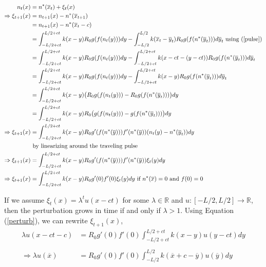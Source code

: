 \documentclass[12pt,english]{article}
\begin{document}
\begin{align}
n_t(x)&=n^*(\overline{x}_t)+\xi_t(x) \notag
\\ \Rightarrow \xi_{t+1}(x)&=n_{t+1}(x)-n^*(\overline{x}_{t+1}) \notag
\\&=n_{t+1}(x)-n^*(\overline{x}_{t}-c) \notag
\\ &=\int_{-L/2+ct}^{L/2+ct}k(x-y)R_0g(f(n_t(y)))dy-\int_{-L/2}^{L/2}k(\overline{x}_{t}-\overline{y}_t)R_0g(f(n^*(\overline{y}_t)))d\overline y_t \text{ using (\ref{pulse})} \notag
\\ &=\int_{-L/2+ct}^{L/2+ct}k(x-y)R_0g(f(n_t(y)))dy-\int_{-L/2+ct}^{L/2+ct}k(x-ct-(y-ct))R_0g(f(n^*(\overline{y}_t)))d\overline y_t \notag
\\ &=\int_{-L/2+ct}^{L/2+ct}k(x-y)R_0g(f(n_t(y)))dy-\int_{-L/2+ct}^{L/2+ct}k(x-y)R_0g(f(n^*(\overline{y}_t)))d\overline y_t \notag
\\ &=\int_{-L/2+ct}^{L/2+ct}k(x-y)\big(R_0g(f(n_t(y)))-R_0g(f(n^*(\overline{y}_t)))\big)dy \notag
\\ &=\int_{-L/2+ct}^{L/2+ct}k(x-y)R_0\big(g(f(n_t(y)))-g(f(n^*(\overline{y}_t)))\big)dy \notag
\\ \Rightarrow \xi_{t+1}(x)&=\int_{-L/2+ct}^{L/2+ct}k(x-y)R_0g'(f(n^*(\overline{y})))f'(n^*(\overline{y}))(n_t(y)-n^*(\overline{y}_t))dy \notag
\\& \text{ by linearizing around the traveling pulse} \notag
\\ \Rightarrow \xi_{t+1}(x)&=\int_{-L/2+ct}^{L/2+ct}k(x-y)R_0g'(f(n^*(\overline{y})))f'(n^*(\overline{y}))\xi_t(y)dy \notag
\\ \Rightarrow \xi_{t+1}(x)&=\int_{-L/2+ct}^{L/2+ct}k(x-y)R_0g'(0)f'(0)\xi_t(y)dy \text{ if $n^*(\overline{x})=0$ and $f(0)=0$} \label{perturb}
\end{align}


If we assume $\xi_t(x)=\lambda^tu(x-ct)$ for some $\lambda\in\mathbb{R}$ and $u:[-L/2,L/2]\to\mathbb{R}$, then the perturbation grows in time if and only if $\lambda >1$.  Using Equation (\ref{perturb}), we can rewrite $\xi_{t+1}(x)$,
\begin{align*}
\lambda u(x-ct-c)&=R_0g'(0)f'(0)\int_{-L/2+ct}^{L/2+ct}k(x-y)u(y-ct)dy
\\ \\\Rightarrow \lambda u(\overline{x})&=R_0g'(0)f'(0)\int_{-L/2}^{L/2}k(\overline{x}+c-\overline{y})u(\overline{y})dy
\end{align*}
\end{document}
